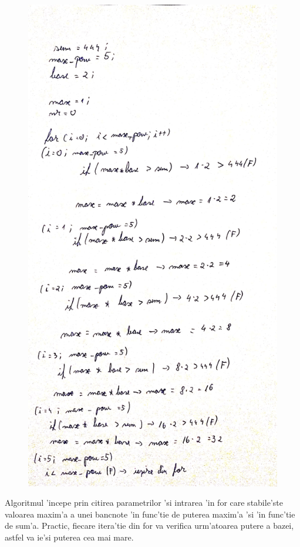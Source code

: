 \begin{figure}[H]
\centering
\includegraphics[scale = 0.12]{Greedy/for}
\end{figure}

\vspace{5mm}
\myindent
Algoritmul 'incepe prin citirea parametrilor 'si intrarea 'in for care stabile'ste valoarea maxim'a a unei bancnote 'in func'tie de puterea maxim'a 'si 'in func'tie de sum'a. Practic, fiecare itera'tie din for va verifica urm'atoarea putere a bazei, astfel va ie'si puterea cea mai mare.

